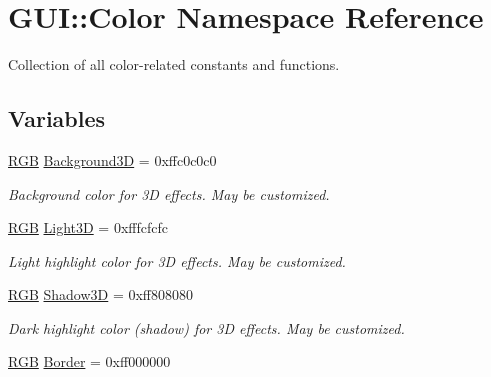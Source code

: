 \hypertarget{namespaceGUI_1_1Color}{\section{G\-U\-I\-:\-:Color Namespace Reference}
\label{namespaceGUI_1_1Color}
}


Collection of all color-\/related constants and functions.  


\subsection*{Variables}
\begin{DoxyCompactItemize}
\item 
\hypertarget{namespaceGUI_1_1Color_a9411bb6ede072fe74ca0814196fa4285}{\hyperlink{namespaceGUI_aeafd135255365f3584da0e982fc79466}{R\-G\-B} \hyperlink{namespaceGUI_1_1Color_a9411bb6ede072fe74ca0814196fa4285}{Background3\-D} = 0xffc0c0c0}\label{namespaceGUI_1_1Color_a9411bb6ede072fe74ca0814196fa4285}

\begin{DoxyCompactList}\small\item\em Background color for 3\-D effects. May be customized. \end{DoxyCompactList}\item 
\hypertarget{namespaceGUI_1_1Color_ab04c614b1d207805cc3c42993c1d595d}{\hyperlink{namespaceGUI_aeafd135255365f3584da0e982fc79466}{R\-G\-B} \hyperlink{namespaceGUI_1_1Color_ab04c614b1d207805cc3c42993c1d595d}{Light3\-D} = 0xfffcfcfc}\label{namespaceGUI_1_1Color_ab04c614b1d207805cc3c42993c1d595d}

\begin{DoxyCompactList}\small\item\em Light highlight color for 3\-D effects. May be customized. \end{DoxyCompactList}\item 
\hypertarget{namespaceGUI_1_1Color_a7869e5355c31f7a2e140c68bb8f8c478}{\hyperlink{namespaceGUI_aeafd135255365f3584da0e982fc79466}{R\-G\-B} \hyperlink{namespaceGUI_1_1Color_a7869e5355c31f7a2e140c68bb8f8c478}{Shadow3\-D} = 0xff808080}\label{namespaceGUI_1_1Color_a7869e5355c31f7a2e140c68bb8f8c478}

\begin{DoxyCompactList}\small\item\em Dark highlight color (shadow) for 3\-D effects. May be customized. \end{DoxyCompactList}\item 
\hypertarget{namespaceGUI_1_1Color_a0b26ea3c319efb85bedea9981b333db1}{\hyperlink{namespaceGUI_aeafd135255365f3584da0e982fc79466}{R\-G\-B} \hyperlink{namespaceGUI_1_1Color_a0b26ea3c319efb85bedea9981b333db1}{Border} = 0xff000000}\label{namespaceGUI_1_1Color_a0b26ea3c319efb85bedea9981b333db1}


\end{DoxyCompactItemize}
